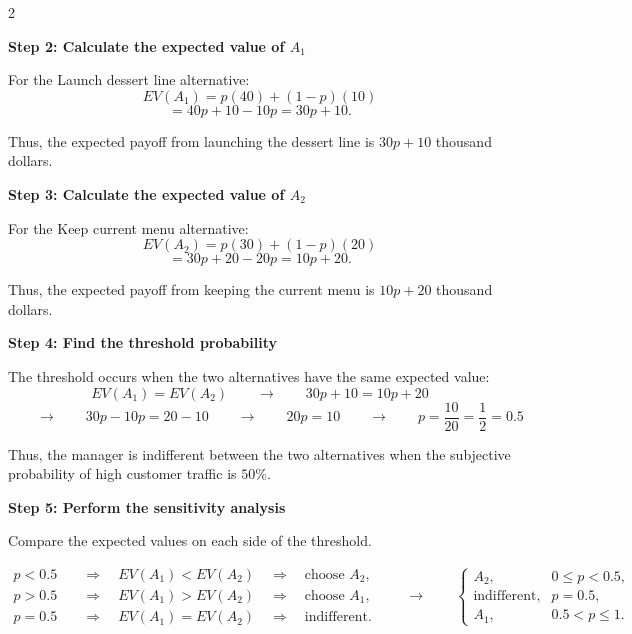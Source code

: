 	\noindent
	\setlength{\columnseprule}{0.4pt} 
	\begin{multicols}{2}
		\vspace{0pt}
		
		\textbf{Step 2: Calculate the expected value of $A_1$}
		
		For the Launch dessert line alternative:
		\[
		EV(A_1)
		=
		p(40)
		+
		(1-p)(10)
		\]
		\[
		=
		40p+10-10p
		=
		30p+10.
		\]
		
		Thus, the expected payoff from launching the dessert line is
		$30p+10$ thousand dollars.
		
		\columnbreak
		
		\textbf{Step 3: Calculate the expected value of $A_2$}
		
		For the Keep current menu alternative:
		\[
		EV(A_2)
		=
		p(30)
		+
		(1-p)(20)
		\]
		\[
		=
		30p+20-20p
		=
		10p+20.
		\]
		
		Thus, the expected payoff from keeping the current menu is
		$10p+20$ thousand dollars.
		
	\end{multicols}
	
	
	\setlength{\columnseprule}{0pt}
	
	\textbf{Step 4: Find the threshold probability}
	
	The threshold occurs when the two alternatives have the same expected
	value:
	\[
	EV(A_1)=EV(A_2)
	\qquad \longrightarrow \qquad
	30p+10=10p+20
	\]
	\[
	\qquad \longrightarrow \qquad
	30p-10p=20-10
	\qquad \longrightarrow \qquad
	20p=10
	\qquad \longrightarrow \qquad
	p=\frac{10}{20}
	=\frac{1}{2}
	=0.5
	\]
	
	Thus, the manager is indifferent between the two alternatives when the
	subjective probability of high customer traffic is $50\%$.
	
	\textbf{Step 5: Perform the sensitivity analysis}
	
	Compare the expected values on each side of the threshold.
	
	\[
	\begin{aligned}
		p<0.5 &\quad\Rightarrow\quad EV(A_1)<EV(A_2) \quad\Rightarrow\quad \text{choose } A_2,\\
		p>0.5 &\quad\Rightarrow\quad EV(A_1)>EV(A_2) \quad\Rightarrow\quad \text{choose } A_1,\\
		p=0.5 &\quad\Rightarrow\quad EV(A_1)=EV(A_2) \quad\Rightarrow\quad \text{indifferent}.
	\end{aligned}
	\qquad \longrightarrow \qquad
	\boxed{
		\begin{cases}
			A_2, & 0\leq p<0.5,\\
			\text{indifferent}, & p=0.5,\\
			A_1, & 0.5<p\leq1.
	\end{cases}}
	\]
	
